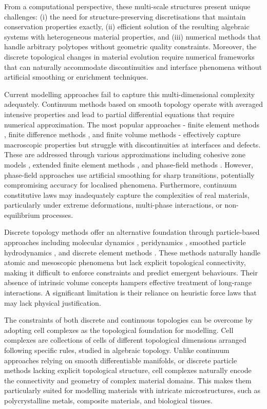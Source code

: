 \documentclass{elsarticle}
\theoremstyle{definition}
\begin{document}
From a computational perspective, these multi-scale structures present unique challenges: (i) the need for structure-preserving discretisations that maintain conservation properties exactly, (ii) efficient solution of the resulting algebraic systems with heterogeneous material properties, and (iii) numerical methods that handle arbitrary polytopes without geometric quality constraints. Moreover, the discrete topological changes in material evolution require numerical frameworks that can naturally accommodate discontinuities and interface phenomena without artificial smoothing or enrichment techniques.

Current modelling approaches fail to capture this multi-dimensional complexity adequately. Continuum methods based on smooth topology \cite{morro2023Continuum} operate with averaged intensive properties and lead to partial differential equations that require numerical approximation. The most popular approaches - finite element methods \cite{brenner2008FEM}, finite difference methods \cite{thomas1995FDM}, and finite volume methods \cite{leveque2012FVM} - effectively capture macroscopic properties but struggle with discontinuities at interfaces and defects. These are addressed through various approximations including cohesive zone models \cite{ruiz2001CZM,park2011CZM}, extended finite element methods \cite{mohammadi2012XFEM,vellwock2024XFEM}, and phase-field methods \cite{chen2022phase,chen2024phase}. However, phase-field approaches use artificial smoothing for sharp transitions, potentially compromising accuracy for localised phenomena. Furthermore, continuum constitutive laws may inadequately capture the complexities of real materials, particularly under extreme deformations, multi-phase interactions, or non-equilibrium processes.

Discrete topology methods offer an alternative foundation through particle-based approaches including molecular dynamics \cite{santamaria2023MD}, peridynamics \cite{madenci2014PD}, smoothed particle hydrodynamics \cite{filho2019SPH}, and discrete element methods \cite{jebahi2015DEM}. These methods naturally handle atomic and mesoscopic phenomena but lack explicit topological connectivity, making it difficult to enforce constraints and predict emergent behaviours. Their absence of intrinsic volume concepts hampers effective treatment of long-range interactions. A significant limitation is their reliance on heuristic force laws that may lack physical justification.

The constraints of both discrete and continuous topologies can be overcome by adopting cell complexes \cite{kozlov2008,knudson2022} as the topological foundation for modelling. Cell complexes are collections of cells of different topological dimensions arranged following specific rules, studied in algebraic topology. Unlike continuum approaches relying on smooth differentiable manifolds, or discrete particle methods lacking explicit topological structure, cell complexes naturally encode the connectivity and geometry of complex material domains. This makes them particularly suited for modelling materials with intricate microstructures, such as polycrystalline metals, composite materials, and biological tissues.
\end{document}
